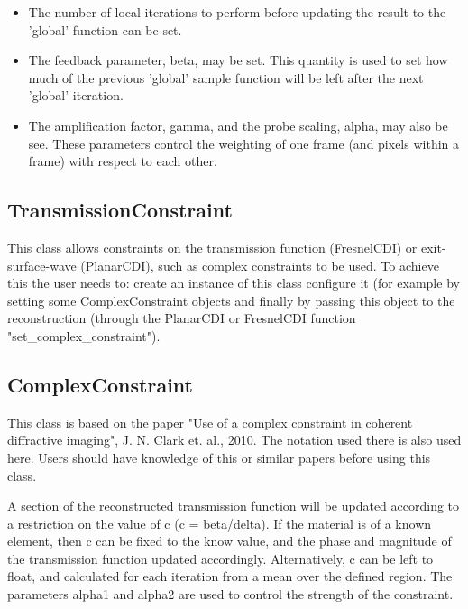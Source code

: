 \documentclass[]{cxs-software}
\begin{document}
\begin{itemize}
\begin{itemize}
\end{itemize}

\item The number of local iterations to perform before updating the
  result to the 'global' function can be set.

\item The feedback parameter, beta, may be set. This quantity is used
  to set how much of the previous 'global' sample function will be
  left after the next 'global' iteration.

\item The amplification factor, gamma, and the probe scaling, alpha,
  may also be see. These parameters control the weighting of one frame
  (and pixels within a frame) with respect to each other.

\end{itemize}

\subsection{TransmissionConstraint}
This class allows constraints on the transmission function
(FresnelCDI) or exit-surface-wave (PlanarCDI), such as complex
constraints to be used. To achieve this the user needs to: create an
instance of this class configure it (for example by setting some
ComplexConstraint objects and finally by passing this object to the
reconstruction (through the PlanarCDI or FresnelCDI function
"set\_complex\_constraint").

\subsection{ComplexConstraint}

This class is based on the paper "Use of a complex constraint in
coherent diffractive imaging", J. N. Clark et. al., 2010. The notation
used there is also used here. Users should have knowledge of this or
similar papers before using this class.

A section of the reconstructed transmission function will be updated
according to a restriction on the value of c (c = beta/delta). If the
material is of a known element, then c can be fixed to the know value,
and the phase and magnitude of the transmission function updated
accordingly. Alternatively, c can be left to float, and calculated for
each iteration from a mean over the defined region. The parameters
alpha1 and alpha2 are used to control the strength of the constraint.
\end{document}
